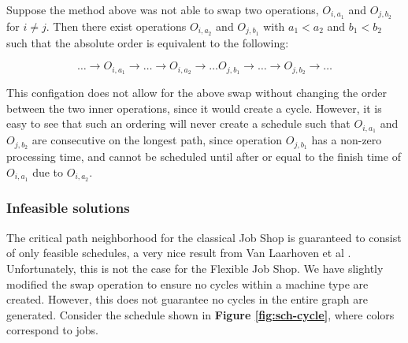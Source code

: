 \documentclass[a4paper,10pt]{article}
\begin{document}
Suppose the method above was not able to swap two operations, $O_{i,a_1}$ and $O_{j,b_2}$ for $i \neq j$. Then there exist operations $O_{i,a_2}$ and $O_{j,b_1}$ with $a_1 < a_2$ and $b_1 < b_2$ such that the absolute order is equivalent to the following:

\[ \dots \rightarrow O_{i,a_1} \rightarrow \dots \rightarrow O_{i,a_2} \rightarrow \dots O_{j,b_1}
\rightarrow \dots \rightarrow O_{j,b_2} \rightarrow \dots \]

This configation does not allow for the above swap without changing the order between the two inner operations, since it would create a cycle. However, it is easy to see that such an ordering will never create a schedule such that $O_{i,a_1}$ and $O_{j,b_2}$ are consecutive on the longest path, since operation $O_{j,b_1}$ has a non-zero processing time, and cannot be scheduled until after or equal to the finish time of $O_{i,a_1}$ due to $O_{i,a_2}$.

\subsubsection{Infeasible solutions}

The critical path neighborhood for the classical Job Shop is guaranteed to consist of only feasible schedules, a very nice result from Van Laarhoven et al \cite{simulatedannealingjsp}. Unfortunately, this is not the case for the Flexible Job Shop. We have slightly modified the swap operation to ensure no cycles within a machine type are created. However, this does not guarantee no cycles in the entire graph are generated. Consider the schedule shown in \textbf{Figure \ref{fig:sch-cycle}}, where colors correspond to jobs.
\end{document}
